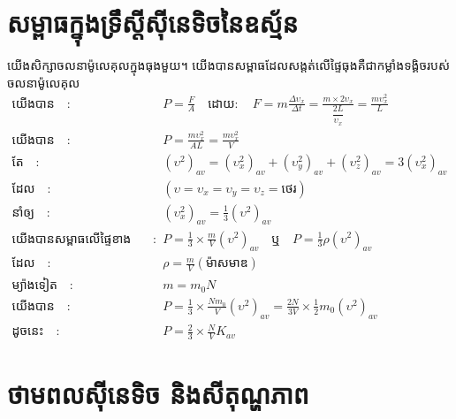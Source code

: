 	\section{សម្ពាធក្នុងទ្រឹស្តីសុីនេទិចនៃឧស្ម័ន}
	\quad យើងសិក្សាចលនាម៉ូលេគុលក្នុងធុងមួយ។ យើងបានសម្ពាធដែលសង្តត់លើផ្ទៃធុងគឺជាកម្លាំងទង្គិចរបស់ចលនាម៉ូលេគុល
	\begin{align*}
	\text{យើងបាន}\quad :&\quad P=\frac{F}{A}\quad \text{ដោយ}: \quad F=m\frac{\Delta \upsilon_{x}}{\Delta t}=\frac{m\times2\upsilon_{x}}{\dfrac{2L}{\upsilon_{x}}}=\frac{m\upsilon^{2}_{x}}{L}\\
	\text{យើងបាន}\quad :&\quad P=\frac{m\upsilon^{2}_{x}}{AL}=\frac{m\upsilon^{2}_{x}}{V}\\
	\text{តែ}\quad :&\quad \left(\upsilon^{2}\right)_{av}=\left(\upsilon^{2}_{x}\right)_{av}+\left(\upsilon^{2}_{y}\right)_{av}+\left(\upsilon^{2}_{z}\right)_{av}=3\left(\upsilon^{2}_{x}\right)_{av}\\\text{ដែល}\quad :&\quad \left(\upsilon=\upsilon_{x}=\upsilon_{y}=\upsilon_{z}=\text{ថេរ}\right)\\
	\text{នាំឲ្យ}\quad :&\quad \left(\upsilon^2_{x}\right)_{av}=\frac{1}{3}\left(\upsilon^2\right)_{av}\\
	\text{យើងបានសម្ពាធលើផ្ទៃខាងនីមួយៗ កំណត់ដោយៈ}\quad :&\quad P=\frac{1}{3}\times\frac{m}{V}\left(\upsilon^{2}\right)_{av}\quad \text{ឬ}\quad P=\frac{1}{3}\rho\left(\upsilon^{2}\right)_{av}\\
	\text{ដែល}\quad :&\quad \rho =\frac{m}{V}\left(\text{ម៉ាសមាឌ}\right)\\
	\text{ម្យ៉ាងទៀត}\quad :&\quad m=m_{0}N\\
	\text{យើងបាន}\quad :&\quad P=\frac{1}{3}\times\frac{Nm_{0}}{V}\left(\upsilon^{2}\right)_{av}=\frac{2N}{3V}\times\frac{1}{2}m_{0}\left(\upsilon^2\right)_{av}\\
	\text{ដូចនេះ}\quad :&\quad P=\frac{2}{3}\times\frac{N}{V}K_{av}
	\end{align*}
	\section{ថាមពលសុីនេទិច និងសីតុណ្ហភាព}
